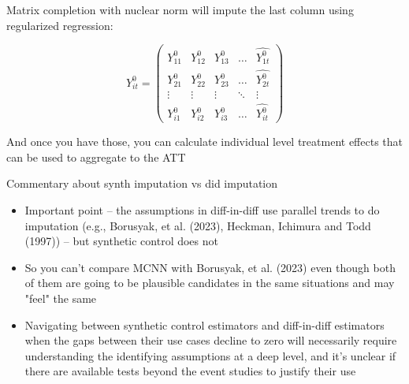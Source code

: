 \documentclass{beamer}
\begin{document}
\begin{frame}[plain]

Matrix completion with nuclear norm will impute the last column using regularized regression:

\begin{center}
\[ Y^0_{it}  =\begin{pmatrix}
    Y^0_{11} & Y^0_{12} & Y^0_{13} & \dots  & \widehat{Y^0_{1t}} \\
    Y^0_{21} & Y^0_{22} & Y^0_{23} & \dots  & \widehat{Y^0_{2t}} \\
    \vdots & \vdots & \vdots & \ddots & \vdots \\
    Y^0_{i1} & Y^0_{i2} & Y^0_{i3} & \dots  & \widehat{Y^0_{it}}
\end{pmatrix}\]
\end{center}

And once you have those, you can calculate individual level treatment effects that can be used to aggregate to the ATT

\end{frame}



\begin{frame}{Commentary about synth imputation vs did imputation}

\begin{itemize}
\item Important point -- the assumptions in diff-in-diff use parallel trends to do imputation (e.g., Borusyak, et al. (2023), Heckman, Ichimura and Todd (1997)) -- but synthetic control does not
\item So you can't compare MCNN with Borusyak, et al. (2023) even though both of them are going to be plausible candidates in the same situations and may "feel" the same
\item Navigating between synthetic control estimators and diff-in-diff estimators when the gaps between their use cases decline to zero will necessarily require understanding the identifying assumptions at a deep level, and it's unclear if there are available tests beyond the event studies to justify their use
\end{itemize}

\end{frame}
\end{document}

